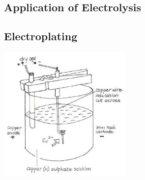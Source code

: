 \begin{multicols}{2}


\section*{Application of Electrolysis}


\subsection{Electroplating}

\begin{center}
\includegraphics[width=0.49\textwidth]{./img/vso/electroplating.jpg}
\end{center}


\end{multicols}
